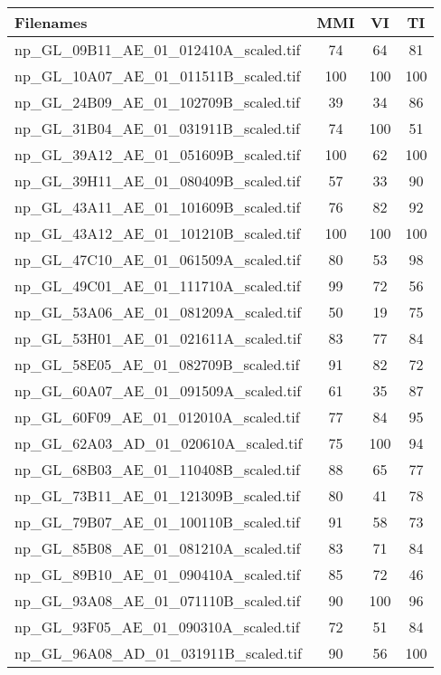 \begin{tabular}{lccc}
\hline
 Filenames                            & MMI & VI  & TI  \\ \hline \hline
 np\_GL\_09B11\_AE\_01\_012410A\_scaled.tif & 74  & 64  & 81  \\
 np\_GL\_10A07\_AE\_01\_011511B\_scaled.tif & 100 & 100 & 100 \\
 np\_GL\_24B09\_AE\_01\_102709B\_scaled.tif & 39  & 34  & 86  \\
 np\_GL\_31B04\_AE\_01\_031911B\_scaled.tif & 74  & 100 & 51  \\
 np\_GL\_39A12\_AE\_01\_051609B\_scaled.tif & 100 & 62  & 100 \\
 np\_GL\_39H11\_AE\_01\_080409B\_scaled.tif & 57  & 33  & 90  \\
 np\_GL\_43A11\_AE\_01\_101609B\_scaled.tif & 76  & 82  & 92  \\
 np\_GL\_43A12\_AE\_01\_101210B\_scaled.tif & 100 & 100 & 100 \\
 np\_GL\_47C10\_AE\_01\_061509A\_scaled.tif & 80  & 53  & 98  \\
 np\_GL\_49C01\_AE\_01\_111710A\_scaled.tif & 99  & 72  & 56  \\
 np\_GL\_53A06\_AE\_01\_081209A\_scaled.tif & 50  & 19  & 75  \\
 np\_GL\_53H01\_AE\_01\_021611A\_scaled.tif & 83  & 77  & 84  \\
 np\_GL\_58E05\_AE\_01\_082709B\_scaled.tif & 91  & 82  & 72  \\
 np\_GL\_60A07\_AE\_01\_091509A\_scaled.tif & 61  & 35  & 87  \\
 np\_GL\_60F09\_AE\_01\_012010A\_scaled.tif & 77  & 84  & 95  \\
 np\_GL\_62A03\_AD\_01\_020610A\_scaled.tif & 75  & 100 & 94  \\
 np\_GL\_68B03\_AE\_01\_110408B\_scaled.tif & 88  & 65  & 77  \\
 np\_GL\_73B11\_AE\_01\_121309B\_scaled.tif & 80  & 41  & 78  \\
 np\_GL\_79B07\_AE\_01\_100110B\_scaled.tif & 91  & 58  & 73  \\
 np\_GL\_85B08\_AE\_01\_081210A\_scaled.tif & 83  & 71  & 84  \\
 np\_GL\_89B10\_AE\_01\_090410A\_scaled.tif & 85  & 72  & 46  \\
 np\_GL\_93A08\_AE\_01\_071110B\_scaled.tif & 90  & 100 & 96  \\
 np\_GL\_93F05\_AE\_01\_090310A\_scaled.tif & 72  & 51  & 84  \\
 np\_GL\_96A08\_AD\_01\_031911B\_scaled.tif & 90  & 56  & 100 \\
\hline
\end{tabular}